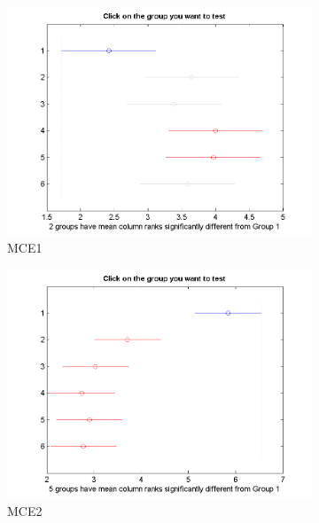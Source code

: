 \begin{figure}
	\centering
	\begin{subfigure}[b]{0.49\linewidth}
		\includegraphics[width=\linewidth]{Figures/D-Bonferroni_HNMED_VS_ED1}
		\caption{MCE1} \label{fig:Bon_M1} 
	\end{subfigure}
	\begin{subfigure}[b]{0.49\linewidth}
		\includegraphics[width=\textwidth]{Figures/D-Bonferroni_HNMED_VS_ED2}
		\caption{MCE2} \label{fig:Bon_M2} 
	\end{subfigure}
	\begin{subfigure}[b]{0.49\linewidth}

\end{subfigure}
\end{figure}
